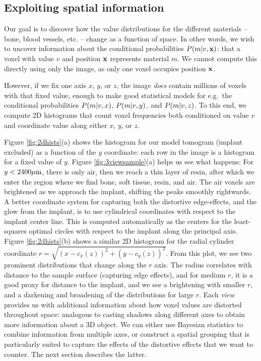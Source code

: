 \documentclass[pdflatex,sn-mathphys]{sn-jnl}%
\theoremstyle{thmstyleone}%
\theoremstyle{thmstyletwo}%
\theoremstyle{thmstylethree}%
\begin{document}
\subsection{Exploiting spatial information}
Our goal is to discover how the value distributions for the different materials -- bone, blood vessels, etc. --
change as a function of space. In other words, we wish to uncover information about the conditional probabilities $P\!\left(m\middle\vert v,\mathbf{x}\right)$: that a voxel with value $v$ and
position $\mathbf{x}$ represents material $m$. We cannot compute this directly using only the image, as only one voxel occupies position $\mathbf{x}$. 

However, if we fix one axis $x$, $y$, or $z$, the image {\em does} contain millions of voxels with that fixed value, enough to make good statistical
models for e.g.~the conditional probabilities $P\!\left(m\middle\vert v,x\right)$, $P\!\left(m\middle\vert v,y\right)$, and $P\!\left(m\middle\vert v,z\right)$. To this end, we compute 2D histograms that count voxel frequencies
both conditioned on value $v$ and coordinate value along either $x$, $y$, or $z$. 

Figure \ref{fig:2dhists}(a)
shows the histogram for our model tomogram (implant excluded) as a function of the $y$ coordinate: each row in the image is a histogram for a fixed value of $y$.
Figure \ref{fig:3viewsample}(a) helps us see what happens: For $y<2400\mu\text{m}$, there is only air, then we reach a thin layer of resin, after which we enter
the region where we find bone, soft tissue, resin, and air. The air voxels are brightened as we approach the implant, shifting the peaks smoothly rightwards.
A better coordinate system for capturing both the distortive edge-effects, and the glow from the implant, is to use cylindrical coordinates with respect
to the implant center line. This is computed automatically as the centers for the least-squares optimal circles with respect to the implant along the principal axis. 
Figure \ref{fig:2dhists}(b) shows a similar 2D histogram for the radial cylinder coordinate $r=\sqrt{\left( x-c_x(z)\right)^2+\left( y-c_y(z)\right)^2}$.
From this plot, we see two prominent distributions that change along the $r$ axis. The radius correlates with distance to the sample surface
(capturing edge effects), and for medium $r$, it is a good proxy for distance to the implant, and we see a brightening with smaller $r$, and a darkening and
broadening of the distributions for large $r$. Each {\em view} provides us with additional information about how voxel values are distorted throughout space:
analogous to casting shadows along different axes to obtain more information about a 3D object. We can either use Bayesian statistics to combine information
from multiple axes, or construct a spatial grouping that is particularly suited to capture the effects of the distortive effects that we want to counter.
The next section describes the latter.
\end{document}
